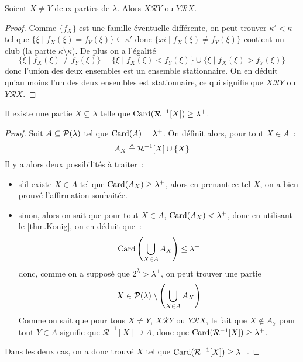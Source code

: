 \begin{property}
  Soient $X\neq Y$ deux parties de $\lambda$. Alors $X\mathcal R Y$ ou
  $Y\mathcal R X$.
\end{property}

\begin{proof}
  Comme $\{f_X\}$ est une famille éventuelle différente, on peut trouver
  $\kappa' < \kappa$ tel que $\{\xi \mid f_X(\xi) =f_Y(\xi)\}\subseteq\kappa'$
  donc $\{xi\mid f_X(\xi)\neq f_Y(\xi)\}$ contient un club (la partie
  $\kappa\setminus \kappa$). De plus on a l'égalité
  \[\{\xi \mid f_X(\xi) \neq f_Y(\xi)\} = \{\xi\mid f_X(\xi) < f_Y(\xi)\}
  \cup \{\xi\mid f_X(\xi) > f_Y(\xi)\}\]
  donc l'union des deux ensembles est un ensemble stationnaire. On en déduit
  qu'au moins l'un des deux ensembles est stationnaire, ce qui signifie que
  $X\mathcal R Y$ ou $Y\mathcal R X$.
\end{proof}

\begin{proposition}
  Il existe une partie $X\subseteq \lambda$ telle que
  $\operatorname{Card}(\mathcal R^{-1}[X]) \geq \lambda^+$.
\end{proposition}

\begin{proof}
  Soit $A\subseteq \mathcal{P}(\lambda)$ tel que $\operatorname{Card}(A) = \lambda^+$. On
  définit alors, pour tout $X\in A$~:
  \[A_X\triangleq \mathcal R^{-1}[X]\cup \{X\}\]
  Il y a alors deux possibilités à traiter~:
  \begin{itemize}
  \item s'il existe $X\in A$ tel que $\operatorname{Card}(A_X)\geq \lambda^+$, alors en
    prenant ce tel $X$, on a bien prouvé l'affirmation souhaitée.
  \item sinon, alors on sait que pour tout $X\in A$, $\operatorname{Card}(A_X)< \lambda^+$,
    donc en utilisant le \cref{thm.Konig}, on en déduit que~:
    \[\operatorname{Card}\left(\bigcup_{X\in A}A_X\right) \leq \lambda^+\]
    donc, comme on a supposé que $2^\lambda > \lambda^+$, on peut trouver une
    partie
    \[X\in \mathcal{P}(\lambda)\setminus\left(\bigcup_{X\in A}A_X\right)\]
    Comme on sait que pour tous $X\neq Y$, $X\mathcal R Y$ ou $Y\mathcal R X$,
    le fait que $X\notin A_Y$ pour tout $Y\in A$ signifie que
    $\mathcal R^{-1}[X]\supseteq A$, donc que
    $\operatorname{Card}(\mathcal R^{-1}[X]) \geq\lambda^+$.
  \end{itemize}
  Dans les deux cas, on a donc trouvé $X$ tel que
  $\operatorname{Card}(\mathcal R^{-1}[X]) \geq \lambda^+$.
\end{proof}

